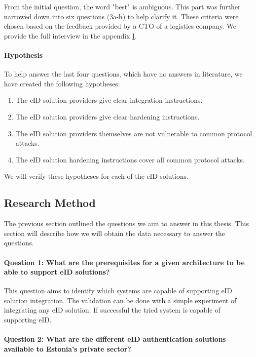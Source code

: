 From the initial question, the word "best" is ambiguous. This part was further narrowed down into six questions (3a-h) to help clarify it. These criteria were chosen based on the feedback provided by a CTO of a logistics company. We provide the full interview in the appendix \hyperref[appendix:interview]{I}.

\paragraph{Hypothesis} To help answer the last four questions, which have no answers in literature, we have created the following hypotheses:

\begin{enumerate}
    \item The eID solution providers give clear integration instructions.
    \item The eID solution providers give clear hardening instructions.
    \item The eID solution providers themselves are not vulnerable to common protocol attacks.
    \item The eID solution hardening instructions cover all common protocol attacks.
\end{enumerate}

We will verify these hypotheses for each of the eID solutions.

\subsection{Research Method}

The previous section outlined the questions we aim to answer in this thesis. This section will describe how we will obtain the data necessary to answer the questions.

\paragraph{Question 1: What are the prerequisites for a given architecture to be able to support eID solutions?}\noindent

This question aims to identify which systems are capable of supporting eID solution integration. The validation can be done with a simple experiment of integrating any eID solution. If successful the tried system is capable of supporting eID.

\paragraph{Question 2: What are the different eID authentication solutions available to Estonia's private sector?}\noindent

